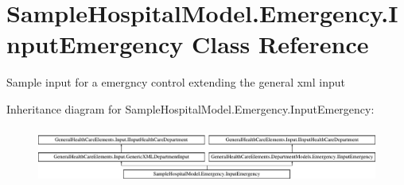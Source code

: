 \hypertarget{class_sample_hospital_model_1_1_emergency_1_1_input_emergency}{}\section{Sample\+Hospital\+Model.\+Emergency.\+Input\+Emergency Class Reference}
\label{class_sample_hospital_model_1_1_emergency_1_1_input_emergency}


Sample input for a emergncy control extending the general xml input  


Inheritance diagram for Sample\+Hospital\+Model.\+Emergency.\+Input\+Emergency\+:\begin{figure}[H]
\begin{center}
\leavevmode
\includegraphics[height=1.850220cm]{class_sample_hospital_model_1_1_emergency_1_1_input_emergency}
\end{center}
\end{figure}
